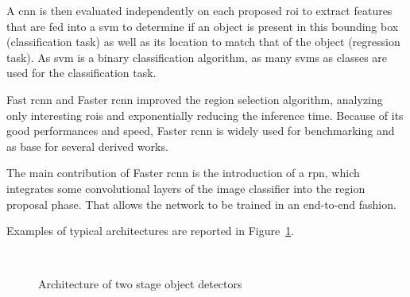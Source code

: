 \documentclass[%
    corpo=12pt,
    twoside,
    stile=classica,   
    tipotesi=magistrale,
    evenboxes,
    english,
	numerazioneromana,
]{toptesi}
\begin{document}
A \gls{cnn} is then evaluated independently on each proposed \gls{roi} to extract features that are fed into a \gls{svm}
to determine if an object is present in this bounding box (classification task) as well as its location to match that of the object (regression task). As \gls{svm} is a binary classification algorithm, as many \glspl{svm} as classes are used for the classification task.

\medskip
Fast \gls{rcnn}\cite{girshick2015fast} and Faster \gls{rcnn}\cite{ren2016faster} improved the region selection algorithm, analyzing only interesting \glspl{roi} and exponentially reducing the inference time. Because of its good performances and speed, Faster \gls{rcnn} is widely used for benchmarking and as base for several derived works.

The main contribution of Faster \gls{rcnn} is the introduction of a \gls{rpn}, which integrates some convolutional layers of the image classifier into the region proposal phase. That allows the network to be trained in an end-to-end fashion.

Examples of typical architectures are reported in Figure~\ref{fig:architectures}.

\begin{figure}[ht]
	\centering
	\\
	\caption{Architecture of two stage object detectors}
	\label{fig:architectures}
\end{figure}
\end{document}
